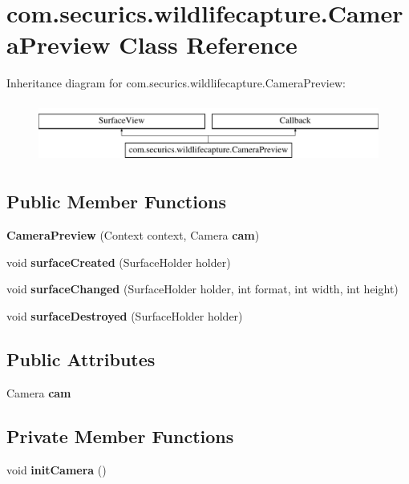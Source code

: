 \section{com.\+securics.\+wildlifecapture.\+Camera\+Preview Class Reference}
\label{classcom_1_1securics_1_1wildlifecapture_1_1_camera_preview}
Inheritance diagram for com.\+securics.\+wildlifecapture.\+Camera\+Preview\+:\begin{figure}[H]
\begin{center}
\leavevmode
\includegraphics[height=2.000000cm]{classcom_1_1securics_1_1wildlifecapture_1_1_camera_preview}
\end{center}
\end{figure}
\subsection*{Public Member Functions}
\begin{DoxyCompactItemize}
\item 
{\bf Camera\+Preview} (Context context, Camera {\bf cam})
\item 
void {\bf surface\+Created} (Surface\+Holder holder)
\item 
void {\bf surface\+Changed} (Surface\+Holder holder, int format, int width, int height)
\item 
void {\bf surface\+Destroyed} (Surface\+Holder holder)
\end{DoxyCompactItemize}
\subsection*{Public Attributes}
\begin{DoxyCompactItemize}
\item 
Camera {\bf cam}
\end{DoxyCompactItemize}
\subsection*{Private Member Functions}
\begin{DoxyCompactItemize}
\item 
void {\bf init\+Camera} ()
\end{DoxyCompactItemize}
